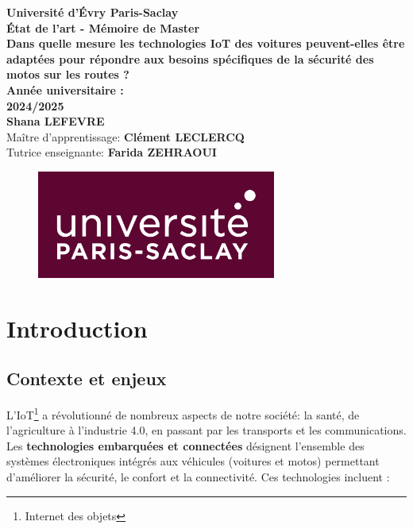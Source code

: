 \documentclass{article}
\begin{document}
\begin{titlepage}
    \begin{center}
        {\Large \textbf{Université d'Évry Paris-Saclay}}\\[0.5cm]
        {\huge \textbf{État de l'art - Mémoire de Master}}\\[3cm]
        {\huge \textbf{Dans quelle mesure les technologies IoT des voitures peuvent-elles être adaptées pour répondre aux besoins spécifiques de la sécurité des motos sur les routes ? }}\\[1cm]
        \textbf{Année universitaire :} \\[0.5cm]
        {\Large \textbf{2024/2025}}\\[1cm]
                {\Large \textbf{Shana LEFEVRE}}\\[2cm]
                {\Large Maître d'apprentissage: \textbf{Clément LECLERCQ}}\\[0.5cm]
                {\Large Tutrice enseignante: \textbf{Farida ZEHRAOUI}}\\[2cm]
                \begin{figure}[h]
    \centering
    \includegraphics[width=0.7\textwidth]{images/logo_paris_saclay.png} 
\end{figure}
    \end{center}
\end{titlepage}

\tableofcontents %
\newpage

\newpage
\section{Introduction}
\subsection{Contexte et enjeux}
L'IoT\footnote{Internet des objets} a révolutionné de nombreux aspects de notre société: la santé, de l'agriculture à l'industrie 4.0, en passant par les transports et les communications.
Les \textbf{technologies embarquées et connectées} désignent l’ensemble des systèmes électroniques intégrés aux véhicules (voitures et motos) permettant d’améliorer la sécurité, le confort et la connectivité. Ces technologies incluent :
\end{document}
